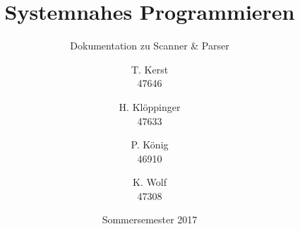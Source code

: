 \titlehead{
	\texttt{[image: hska\_logo]}
}

\title{Systemnahes Programmieren}
\subtitle{Dokumentation zu Scanner \& Parser}
\author{%
	T. Kerst\\
	\textsc{47646}
	\and
	H. Klöppinger\\
	\textsc{47633}
	\and
	P. König\\
	\textsc{46910}
	\and
	K. Wolf\\
	\textsc{47308}
}
\date{Sommersemester 2017}
\publishers{
    \textbf{Dozent:} Prof.~Dr.~rer.~nat.~Oliver Waldhorst
}
\maketitle

\clearpage
